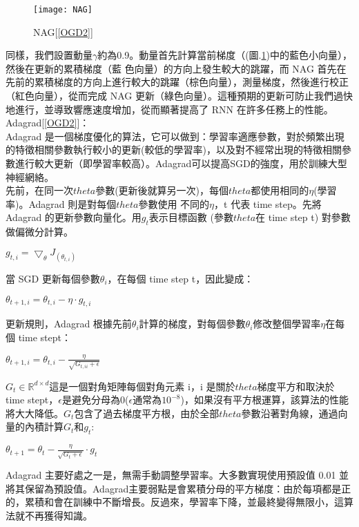 \begin{itemize}
\begin{figure}[hbt!]
\begin{center}
\texttt{[image: NAG]}
\caption{\Large NAG[\ref{OGD2}]}
\label{NAG}
\end{center}
\end{figure}
同樣，我們設置動量$\gamma$約為0.9。動量首先計算當前梯度（(圖.\ref{NAG})中的藍色小向量），然後在更新的累積梯度（藍 色向量）的方向上發生較大的跳躍，而 NAG 首先在先前的累積梯度的方向上進行較大的跳躍（棕色向量），測量梯度，然後進行校正（紅色向量），從而完成 NAG 更新（綠色向量）。這種預期的更新可防止我們過快地進行，並導致響應速度增加，從而顯著提高了 RNN 在許多任務上的性能。\\
Adagrad[\ref{OGD2}]：\\
 Adagrad 是一個梯度優化的算法，它可以做到：學習率適應參數，對於頻繁出現的特徵相關參數執行較小的更新(較低的學習率)，以及對不經常出現的特徵相關參數進行較大更新（即學習率較高）。Adagrad可以提高SGD的強度，用於訓練大型神經網絡。\\
 先前，在同一次$theta$參數(更新後就算另一次)，每個$theta$都使用相同的$\eta$(學習率)。Adagrad 則是對每個$theta$參數使用 不同的$\eta$，t 代表 time step。先將 Adagrad 的更新參數向量化。用$g_t$表示目標函數 (參數$theta$在 time step t) 對參數做偏微分計算。
\begin{center}
$g_{t,i}=\bigtriangledown_{\theta}J_{(\theta_{t,i})}$
\end{center}
當 SGD 更新每個參數$\theta_i$，在每個 time step t，因此變成：
\begin{center}
$\theta_{t+1,i}=\theta_{t,i}-\eta\cdot g_{t,i}$
\end{center}
更新規則，Adagrad 根據先前$\theta_i$計算的梯度，對每個參數$\theta_i$修改整個學習率$\eta$在每個 time stept：
\begin{center}
$\theta_{t+1,i}=\theta_{t,i}-\frac{\eta}{\sqrt{G_{t,ii}+\epsilon}}$
\end{center}
$G_t \in \mathbb{R}^{d\times d}$這是一個對角矩陣每個對角元素 i，i 是關於$theta$梯度平方和取決於 time stept，$\epsilon$是避免分母為0($\epsilon$通常為$10^{-8}$)，如果沒有平方根運算，該算法的性能將大大降低。$G_t$包含了過去梯度平方根，由於全部$theta$參數沿著對角線，通過向量的內積計算$G_t$和$g_t$:
\begin{center}
$\theta_{t+1}=\theta_{t}-\frac{\eta}{\sqrt{G_{t}+\epsilon}}\cdot g_t$
\end{center}
 Adagrad 主要好處之一是，無需手動調整學習率。大多數實現使用預設值 0.01 並將其保留為預設值。Adagrad主要弱點是會累積分母的平方梯度：由於每項都是正的，累積和會在訓練中不斷增長。反過來，學習率下降，並最終變得無限小，這算法就不再獲得知識。\\

\end{itemize}
